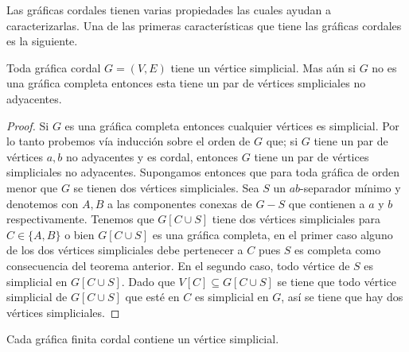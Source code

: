 Las gráficas cordales tienen varias propiedades las cuales ayudan a caracterizarlas. Una de las primeras características que tiene las gráficas cordales es la siguiente.

\begin{teorema}
\label{teo:103}
    Toda gráfica cordal $G=(V,E)$ tiene un vértice simplicial. Mas aún si $G$ no es una gráfica completa entonces esta tiene un par de vértices smpliciales no adyacentes.
\end{teorema}

\begin{proof}
    Si $G$ es una gráfica completa entonces cualquier vértices es simplicial. Por lo tanto probemos vía inducción sobre el orden de $G$ que; si $G$ tiene un par de vértices $a,b$ no adyacentes y es cordal, entonces $G$ tiene un par de vértices simpliciales no adyacentes. Supongamos entonces que para toda gráfica de orden menor que $G$ se tienen dos vértices simpliciales. Sea $S$ un $ab$-separador mínimo y denotemos con $A,B$ a las componentes conexas de $G-S$ que contienen a $a$ y $b$ respectivamente. Tenemos que $G[C \cup S]$ tiene dos vértices simpliciales para $C\in \{A,B\}$ o bien $G[C \cup S]$ es una gráfica completa, en el primer caso alguno de los dos vértices simpliciales debe pertenecer a $C$ pues $S$ es completa como consecuencia del teorema anterior. En el segundo caso, todo vértice de $S$ es simplicial en $G[C \cup S]$. Dado que $V[C]\subseteq G[C \cup S]$ se tiene que todo vértice simplicial de $G[C \cup S]$ que esté en $C$ es simplicial en $G$, así se tiene que hay dos vértices simpliciales.
\end{proof}

\begin{teorema}
    Cada gráfica finita cordal contiene un vértice simplicial.
\end{teorema}

